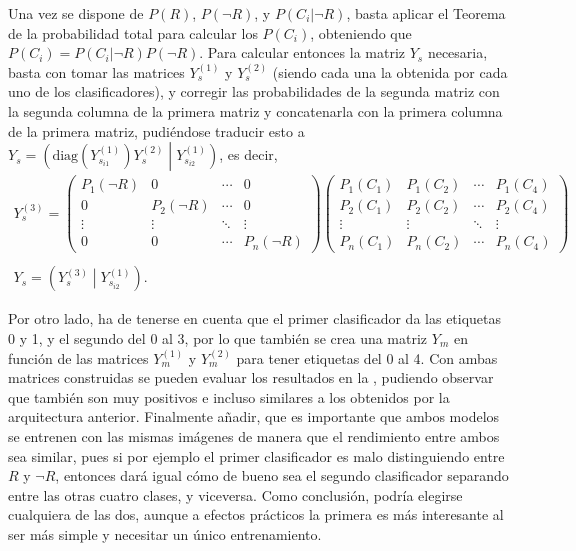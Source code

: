 				Una vez se dispone de $P(R)$, $P(\lnot R)$, y $P(C_i|\lnot R)$, basta aplicar el Teorema de la probabilidad total para calcular los $P(C_i)$, obteniendo que $P(C_i) = P(C_i | \lnot R) P(\lnot R)$. Para calcular entonces la matriz $Y_s$ necesaria, basta con tomar las matrices $Y_s^{(1)}$ y $Y_s^{(2)}$ (siendo cada una la obtenida por cada uno de los clasificadores), y corregir las probabilidades de la segunda matriz con la segunda columna de la primera matriz y concatenarla con la primera columna de la primera matriz, pudiéndose traducir esto a $Y_s = \left(\text{diag}\left(Y_{s_{i1}}^{(1)}\right)Y_s^{(2)}\middle|Y_{s_{i2}}^{(1)}\right)$, es decir, 
				$$
				\begin{gathered}
					Y_s^{(3)} = \begin{pmatrix}
						P_1(\lnot R) & 0 & \cdots & 0\\
						0 & P_2(\lnot R) & \cdots & 0\\
						\vdots & \vdots & \ddots & \vdots\\
						0 & 0 & \cdots & P_n(\lnot R)
					\end{pmatrix}
					\begin{pmatrix}
						P_1(C_1) & P_1(C_2) & \cdots & P_1(C_4)\\
						P_2(C_1) & P_2(C_2) & \cdots & P_2(C_4)\\
						\vdots & \vdots & \ddots & \vdots\\
						P_n(C_1) & P_n(C_2) & \cdots & P_n(C_4)
					\end{pmatrix}\\\\
					Y_s = \left(Y_s^{(3)} \middle| Y_{s_{i2}}^{(1)}\right). 
				\end{gathered}
				$$
				
				Por otro lado, ha de tenerse en cuenta que el primer clasificador da las etiquetas 0 y 1, y el segundo del 0 al 3, por lo que también se crea una matriz $Y_m$ en función de las matrices $Y_m^{(1)}$ y $Y_m^{(2)}$ para tener etiquetas del 0 al 4. Con ambas matrices construidas se pueden evaluar los resultados en la , pudiendo observar que también son muy positivos e incluso similares a los obtenidos por la arquitectura anterior. Finalmente añadir, que es importante que ambos modelos se entrenen con las mismas imágenes de manera que el rendimiento entre ambos sea similar, pues si por ejemplo el primer clasificador es malo distinguiendo entre $R$ y $\lnot R$, entonces dará igual cómo de bueno sea el segundo clasificador separando entre las otras cuatro clases, y viceversa. Como conclusión, podría elegirse cualquiera de las dos, aunque a efectos prácticos la primera es más interesante al ser más simple y necesitar un único entrenamiento. 
				
